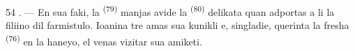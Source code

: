 \begin{VUpage}[56]{54}
. --- En sua faki, la  \textsuperscript{(79)} manjas\nl
avide la  \textsuperscript{(80)} delikata quan adportas a li\nl
la filiino dil farmistulo. Ioanina tre amas sua\nl
kunikli e, singladie, querinta la fresha  \textsuperscript{(76)}\nl
en la haneyo, el venas vizitar sua amiketi.

\VUsaut{6.0mm}
\VUfilet{22mm}
\end{VUpage}
